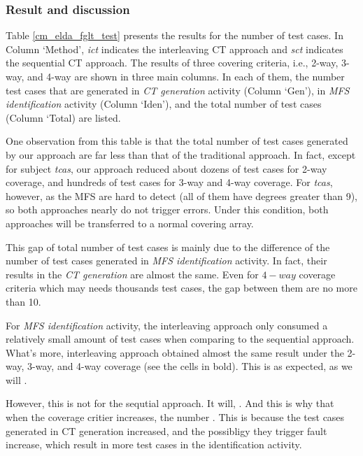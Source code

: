 \documentclass{sig-alternate}
\begin{document}




\subsubsection{Result and discussion}
Table \ref{cm_elda_fglt_test} presents the results for the number of test cases. In Column `Method', \emph{ict} indicates the interleaving CT approach and \emph{sct} indicates the sequential CT approach. The results of three covering criteria, i.e., 2-way, 3-way, and 4-way are shown in three main columns. In each of them, the number test cases that are generated in \emph{CT generation} activity (Column `Gen'), in \emph{MFS identification} activity (Column `Iden'), and the total number of test cases (Column `Total) are listed.

One observation from this table is that the total number of test cases generated by our approach are far less than that of the traditional approach. In fact, except for subject \emph{tcas}, our approach reduced about dozens of test cases for 2-way coverage, and hundreds of test cases for 3-way and 4-way coverage. For \emph{tcas}, however, as the MFS are hard to detect (all of them have degrees greater than 9), so both approaches nearly do not trigger errors. Under this condition, both approaches will be transferred to a normal covering array.

This gap of total number of test cases is mainly due to the difference of the number of test cases generated in \emph{MFS identification} activity. In fact, their results in the \emph{CT generation} are almost the same. Even for $4-way$ coverage criteria which may needs thousands test cases, the gap between them are no more than 10. 

For \emph{MFS identification} activity, the interleaving approach only consumed a relatively small amount of test cases when comparing to the sequential approach. What's more, interleaving approach obtained almost the same result under the 2-way, 3-way, and 4-way coverage (see the cells in bold). This is as expected, as we will . 

However, this is not for the sequtial approach. It will, . And this is why that when the coverage critier increases, the number . This is because the test cases generated in CT generation increased, and the possibligy they trigger fault increase, which result in more test cases in the identification activity.
\end{document}
